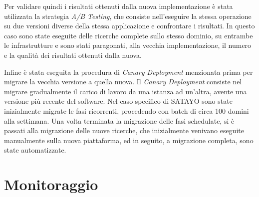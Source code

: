 Per validare quindi i risultati ottenuti dalla nuova implementazione è stata
utilizzata la strategia \textit{A/B Testing}\cite{QUIN2024112011}, che consiste nell'eseguire
la stessa operazione su due versioni diverse della stessa applicazione e confrontare
i risultati. In questo caso sono state eseguite delle ricerche complete sullo
stesso dominio, su entrambe le infrastrutture e sono stati paragonati, alla
vecchia implementazione, il numero e la qualità dei risultati ottenuti dalla nuova.

Infine è stata eseguita la procedura di \textit{Canary Deployment} menzionata
prima per migrare la vecchia versione a quella nuova. Il \textit{Canary
Deployment} consiste nel migrare gradualmente il carico di lavoro da una istanza
ad un'altra, avente una versione più recente del software. Nel caso specifico di
SATAYO sono state inizialmente migrate le fasi ricorrenti, procedendo con batch di
circa 100 domini alla settimana. Una volta terminata la migrazione delle fasi
schedulate, si è passati alla migrazione delle nuove ricerche, che inizialmente
venivano eseguite manualmente sulla nuova piattaforma, ed in seguito, a
migrazione completa, sono state automatizzate.

\section{Monitoraggio}
\label{sec:monitoraggio}

